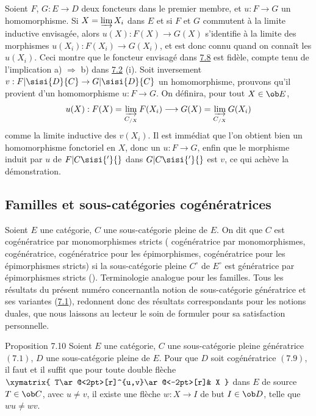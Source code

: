 Soient $F$, $G:E\rightarrow D$ deux foncteurs dans le premier
membre, et $u:F\rightarrow G$ un homomorphisme. Si $X=\varinjlim
X_i$ dans $E$ et si $F$ et $G$ commutent à la limite inductive
envisagée, alors $u(X):F(X)\rightarrow G(X)$ s'identifie à la limite
des morphismes $u(X_i):F(X_i)\rightarrow G(X_i)$, et est donc connu
quand on connaît les $u(X_i)$. Ceci montre que le foncteur envisagé
dans \hyperref[I.prop7.8]{7.8} est fidèle, compte tenu de l'implication a)
$\Rightarrow$ b) dans \hyperref[I.prop7.2]{7.2} (i). Soit inversement $v:F|
\sisi{D}{C}\rightarrow G|\sisi{D}{C}$ un homomorphisme, prouvons qu'il provient d'un
homomorphisme $u:F\rightarrow G$. On définira, pour tout $X\in \ob
E$,
$$
u(X):F(X)=\varinjlim_{C_{/X}}F(X_i)\longrightarrow
G(X)=\varinjlim_{C_{/X}}G(X_i)
$$
comme la limite inductive des $v(X_i)$. Il est immédiat que l'on
obtient bien un homomorphisme fonctoriel en $X$, donc un
$u:F\rightarrow G$,  enfin que le morphisme induit par $u$ de
$F|C\sisi{'}{}$ dans $G|C\sisi{'}{}$ est $v$, ce qui achève la démonstration.


\setcounter{subsection}{8}
\subsection{Familles et sous-catégories cogénératrices}

Soient $E$ une catégorie, $C$ une sous-catégorie pleine de $E$. On
dit que $C$ est cogénératrice par monomorphismes stricts (\resp
cogénératrice par monomorphismes, \resp cogénératrice, \resp
cogénératrice pour les épimorphismes, \resp cogénératrice pour les
épimorphismes stricts) si la sous-catégorie pleine $C^\circ$ de
$E^\circ$ est génératrice par épimorphismes stricts (\resp\ldotsn).
Terminologie analogue pour les familles. Tous les résultats du
présent numéro concernant\pageoriginale la notion de sous-catégorie
génératrice et ses variantes (\hyperref[I.def7.1]{7.1}), redonnent donc
des résultats
correspondants pour les notions duales, que nous laissons au lecteur
le soin de formuler pour sa satisfaction personnelle.

\begin{enonce*}{Proposition 7.10}
Soient $E$ une catégorie, $C$ une sous-catégorie pleine
génératrice
$(7.1)$, $D$ une sous-catégorie pleine de $E$. Pour que $D$ soit
cogénératrice $(7.9)$, il faut et il suffit que pour toute double
flèche $\xymatrix{ T\ar@<2pt>[r]^{u,v}\ar@<-2pt>[r]& X }$ dans $E$
de source $T\in \ob C$, avec $u\neq v$, il existe une flèche
$w:X\rightarrow I$ de but $I\in \ob D$, telle que $wu\neq wv$.
\end{enonce*}

